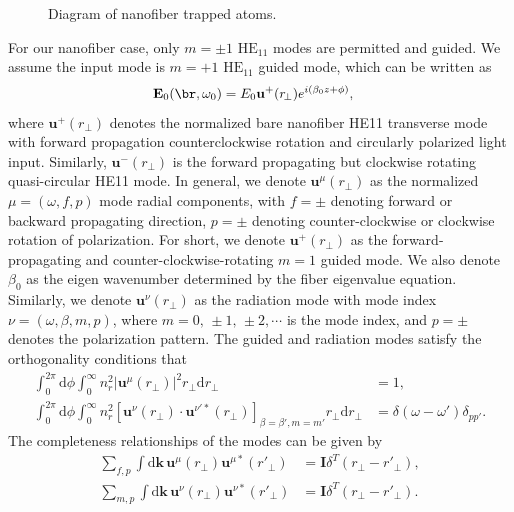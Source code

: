 \documentclass[]{report}
\begin{document}
\begin{figure}
\centering{}
\caption{Diagram of nanofiber trapped atoms. }
\end{figure}

For our nanofiber case, only $ m=\pm 1 $ $ \text{HE}_{11} $ modes are permitted and guided. We assume the input mode is $ m=+1 $ $ \text{HE}_{11} $ guided mode, which can be written as 
\begin{align}
\mathbf{E}_0(\br,\omega_0)&=E_0 \mathbf{u}^+(r\!_\perp ) e^{i(\beta_0 z+\phi)}, 
\end{align}
where $ \mathbf{u}^{+}(r\!_\perp ) $ denotes the normalized bare nanofiber HE11 transverse mode with forward propagation counterclockwise rotation and circularly polarized light input. Similarly, $ \mathbf{u}^{-}(r\!_\perp ) $ is the forward propagating but clockwise rotating quasi-circular HE11 mode. In general, we denote  $ \mathbf{u}^{\mu}(r\!_\perp ) $ as the normalized $\mu=(\omega,f,p)$ mode radial components, with $ f=\pm $ denoting forward or backward propagating direction, $ p=\pm $ denoting counter-clockwise or clockwise rotation of polarization. For short, we denote $\mathbf{u}^+(r\!_\perp )$ as the forward-propagating and counter-clockwise-rotating $m=1$ guided mode. We also denote $ \beta_0 $ as the eigen wavenumber determined by the fiber eigenvalue  equation. Similarly, we denote $ \mathbf{u}^{\nu}(r\!_\perp ) $ as the radiation mode with mode index $ \nu=(\omega,\beta,m,p) $, where $ m=0,\,\pm 1,\,\pm 2,\cdots $ is the mode index, and $p=\pm$ denotes the polarization pattern. The guided and radiation modes satisfy the orthogonality conditions that 
\begin{align}
\int_0^{2\pi}\mathrm{d}\phi \int_0^\infty n_{r}^2|\mathbf{u}^{\mu}(r\!_\perp )|^2r\!_\perp \mathrm{d}r\!_\perp &=1,\\
\int_0^{2\pi}\mathrm{d}\phi \int_0^\infty n_{r}^2\left[\mathbf{u}^{\nu}(r\!_\perp )\cdot\mathbf{u}^{\nu'*}(r\!_\perp )\right]_{\beta=\beta',m=m'}r\!_\perp \mathrm{d}r\!_\perp &=\delta(\omega-\omega')\delta_{pp'}.
\end{align}
The completeness relationships of the modes can be given by
\begin{align}
\sum_{f,p}\int \mathrm{d}\mathbf{k} \,\mathbf{u}^{\mu}(r\!_\perp )\mathbf{u}^{\mu*}(r'\!_\perp ) &= \mathbf{I}\delta^T(r\!_\perp-r'\!_\perp),\\
\sum_{m,p}\int \mathrm{d}\mathbf{k} \, \mathbf{u}^{\nu}(r\!_\perp )\mathbf{u}^{\nu*}(r'\!_\perp ) &=\mathbf{I}\delta^T(r\!_\perp-r'\!_\perp).
\end{align}
\end{document}
